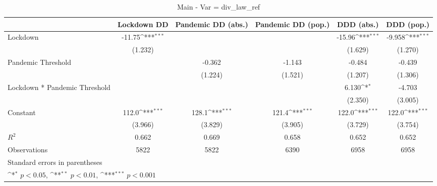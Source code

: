 \documentclass{article}
\begin{document}
{
\def\sym#1{\ifmmode^{#1}\else\(^{#1}\)\fi}
\begin{longtable}{l*{5}{c}}
\caption{Main - Var = div\_law\_ref}\\
\hline\hline\endfirsthead\hline\endhead\hline\endfoot\endlastfoot
                &\multicolumn{1}{c}{Lockdown DD}&\multicolumn{1}{c}{Pandemic DD (abs.)}&\multicolumn{1}{c}{Pandemic DD (pop.)}&\multicolumn{1}{c}{DDD (abs.)}&\multicolumn{1}{c}{DDD (pop.)}\\
\hline
Lockdown        &   -11.75\sym{***}&                  &                  &   -15.96\sym{***}&   -9.958\sym{***}\\
                &  (1.232)         &                  &                  &  (1.629)         &  (1.270)         \\
Pandemic Threshold&                  &   -0.362         &   -1.143         &   -0.484         &   -0.439         \\
                &                  &  (1.224)         &  (1.521)         &  (1.207)         &  (1.306)         \\
Lockdown * Pandemic Threshold&                  &                  &                  &    6.130\sym{*}  &   -4.703         \\
                &                  &                  &                  &  (2.350)         &  (3.005)         \\
Constant        &    112.0\sym{***}&    128.1\sym{***}&    121.4\sym{***}&    122.0\sym{***}&    122.0\sym{***}\\
                &  (3.966)         &  (3.829)         &  (3.905)         &  (3.729)         &  (3.754)         \\
\hline
\(R^{2}\)       &    0.662         &    0.669         &    0.658         &    0.652         &    0.652         \\
Observations    &     5822         &     5822         &     6390         &     6958         &     6958         \\
\hline\hline
\multicolumn{6}{l}{\footnotesize Standard errors in parentheses}\\
\multicolumn{6}{l}{\footnotesize \sym{*} \(p<0.05\), \sym{**} \(p<0.01\), \sym{***} \(p<0.001\)}\\
\end{longtable}
}
\end{document}
